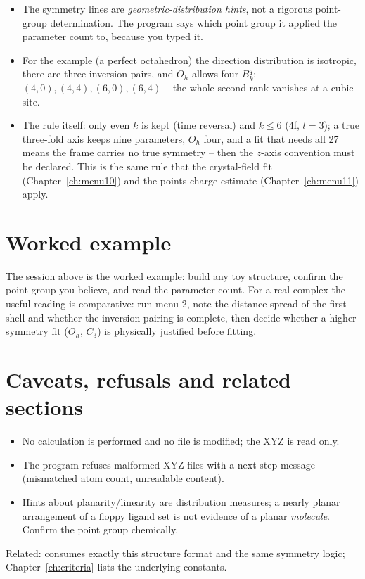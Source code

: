 \begin{readbox}
\begin{itemize}
  \item The symmetry lines are \emph{geometric-distribution hints}, not a
    rigorous point-group determination. The program says which point group it
    applied the parameter count to, because you typed it.
  \item For the example (a perfect octahedron) the direction distribution is
    isotropic, there are three inversion pairs, and $O_h$ allows four
    $B_k^q$: $(4,0), (4,4), (6,0), (6,4)$ -- the whole second rank vanishes at
    a cubic site.
  \item The rule itself: only even $k$ is kept (time reversal) and $k \le 6$
    (4f, $l = 3$); a true three-fold axis keeps nine parameters, $O_h$ four,
    and a fit that needs all 27 means the frame carries no true symmetry --
    then the $z$-axis convention must be declared. This is the same rule that
    the crystal-field fit (Chapter~\ref{ch:menu10}) and the points-charge
    estimate (Chapter~\ref{ch:menu11}) apply.
\end{itemize}
\end{readbox}

\section{Worked example}

The session above is the worked example: build any toy structure, confirm the
point group you believe, and read the parameter count. For a real complex the
useful reading is comparative: run menu 2, note the distance spread of the
first shell and whether the inversion pairing is complete, then decide whether
a higher-symmetry fit ($O_h$, $C_3$) is physically justified before fitting.

\section{Caveats, refusals and related sections}

\begin{refusalbox}
\begin{itemize}
  \item No calculation is performed and no file is modified; the XYZ is read
    only.
  \item The program refuses malformed XYZ files with a next-step message
    (mismatched atom count, unreadable content).
  \item Hints about planarity/linearity are distribution measures; a nearly
    planar arrangement of a floppy ligand set is not evidence of a planar
    \emph{molecule}. Confirm the point group chemically.
\end{itemize}
\end{refusalbox}

Related:  consumes exactly this structure format and the same
symmetry logic; Chapter~\ref{ch:criteria} lists the underlying constants.
